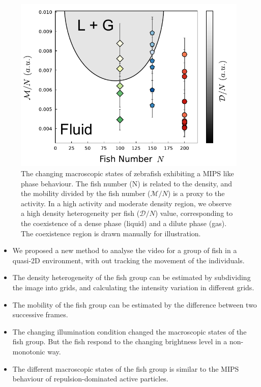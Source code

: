 \documentclass[11pt,twoside]{report}
\begin{document}
\begin{figure}
  \includegraphics[width=\linewidth]{phase}
  \caption[MIPS like phase behaviour of zebrafish]{
  The changing macroscopic states of zebrafish exhibiting a MIPS like phase behaviour. The fish number (\gls{N}) is related to the density, and the mobility divided by the fish number ($\mathcal{M}/N$) is a proxy to the activity. In a high activity and moderate density region, we observe a high density heterogeneity per fish ($\mathcal{D}/N$) value, corresponding to the coexistence of a dense phase (liquid) and a dilute phase (gas). The coexistence region is drawn manually for illustration.
  }
  \label{fig:phase-mips}
\end{figure}

\vfill

\begin{adjustwidth}{-5cm}{0cm}
\begin{tcolorbox}[
fonttitle=\sffamily\Large,
right=0.1\linewidth,
top=5mm,
bottom=5mm,
title=Summary of Appendix A,
]

\begin{itemize}
	\item We proposed a new method to analyse the video for a group of fish in a quasi-2D environment, with out tracking the movement of the individuals.
	\item The density heterogeneity of the fish group can be estimated by subdividing the image into grids, and calculating the intensity variation in different grids.
	\item The mobility of the fish group can be estimated by the difference between two successive frames.
	\item The changing illumination condition changed the macroscopic states of the fish group. But the fish respond to the changing brightness level in a non-monotonic way.
	\item The different macroscopic states of the fish group is similar to the MIPS behaviour of repulsion-dominated active particles.
\end{itemize}
\end{tcolorbox}

\end{adjustwidth}
\end{document}
